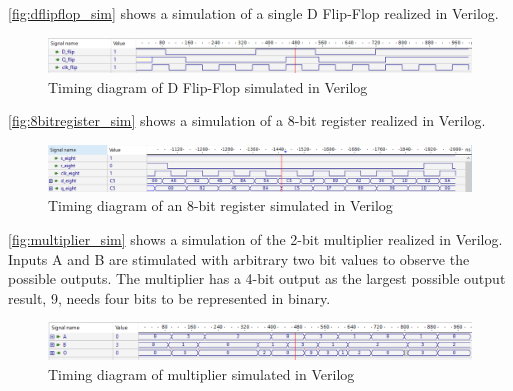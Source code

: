 \autoref{fig:dflipflop_sim} shows a simulation of a single D Flip-Flop realized in Verilog.

\begin{figure}[H]
    \centering
    \includegraphics[width=\textwidth]{Figures/Test of Dflipflop.png}
    \caption{Timing diagram of D Flip-Flop simulated in Verilog}
    \label{fig:dflipflop_sim}
\end{figure}

\autoref{fig:8bitregister_sim} shows a simulation of a 8-bit register realized in Verilog.

\begin{figure}[H]
    \centering
    \includegraphics[width=\textwidth]{Figures/VerilogPlot_8bitreg.png}
    \caption{Timing diagram of an 8-bit register simulated in Verilog}
    \label{fig:8bitregister_sim}
\end{figure}

\autoref{fig:multiplier_sim} shows a simulation of the 2-bit multiplier realized in Verilog. Inputs A and B are stimulated with arbitrary two bit values to observe the possible outputs. The multiplier has a 4-bit output as the largest possible output result, 9, needs four bits to be represented in binary.

\begin{figure}[H]
    \centering
    \includegraphics[width=\textwidth]{Figures/Test of multiplier.png}
    \caption{Timing diagram of multiplier simulated in Verilog}
    \label{fig:multiplier_sim}
\end{figure}




